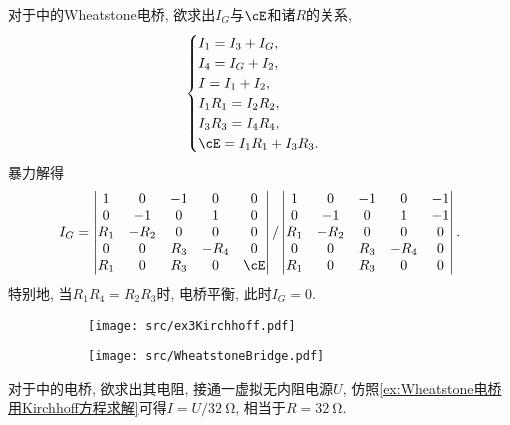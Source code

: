 \documentclass[../Electromagnetism.tex]{subfiles}
\begin{document}
\begin{ex}
	\label{ex:Wheatstone电桥用Kirchhoff方程求解}
	对于中的Wheatstone电桥, 欲求出$I_G$与$\cE$和诸$R$的关系,
	\[ \begin{cases}
		I_1 = I_3 + I_G,\\
		I_4 = I_G + I_2,\\
		I = I_1 + I_2,\\
		I_1 R_1 = I_2 R_2,\\
		I_3 R_3 = I_4 R_4,\\
		\cE = I_1 R_1 + I_3 R_3.
	\end{cases} \]
	暴力解得
	\[ I_G = 
		\begin{vmatrix}
 		1 & 0 & -1 & 0 & 0 \\
 		0 & -1 & 0 & 1 & 0 \\
 		R_1 & -R_2 & 0 & 0 & 0 \\
 		0 & 0 & R_3 & -R_4 & 0 \\
 		R_1 & 0 & R_3 & 0 & \cE \\
		\end{vmatrix}/
		\begin{vmatrix}
 		1 & 0 & -1 & 0 & -1 \\
 		0 & -1 & 0 & 1 & -1 \\
 		R_1 & -R_2 & 0 & 0 & 0 \\
 		0 & 0 & R_3 & -R_4 & 0 \\
 		R_1 & 0 & R_3 & 0 & 0 \\
		\end{vmatrix}.
	\]
	特别地, 当$R_1 R_4 = R_2 R_3$时, 电桥平衡, 此时$I_G = 0$.
\end{ex}
\begin{figure}
	\centering
	\begin{subfigure}[b]{.45\textwidth}	
		\centering
		\texttt{[image: src/ex3Kirchhoff.pdf]}
		\caption{}
		\label{fig:Kirchhoff方程组求解示例3}
	\end{subfigure}	
	\begin{subfigure}[b]{.53\textwidth}
		\centering
		\texttt{[image: src/WheatstoneBridge.pdf]}
		\caption{}
		\label{fig:Wheatstone电桥变换为适用Thevenin定理的情形}
	\end{subfigure}
	\caption{}
\end{figure}
\begin{ex}
	对于中的电桥, 欲求出其电阻, 接通一虚拟无内阻电源$U$, 仿照\cref{ex:Wheatstone电桥用Kirchhoff方程求解}可得$I = U/\SI{32}{\ohm}$, 相当于$R=\SI{32}{\ohm}$.
\end{ex}
\end{document}
